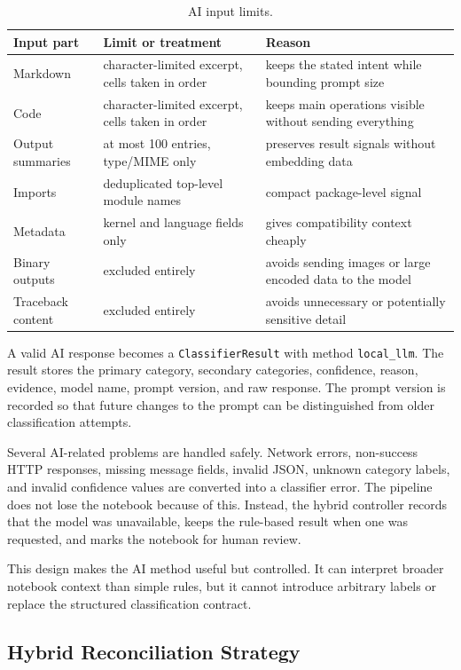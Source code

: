 \begin{table}[ht]
\centering
\caption{AI input limits.}
\label{tab:ai-input-limits}
\small
\begin{tabularx}{\textwidth}{@{}p{2.8cm}p{4.2cm}X@{}}
\toprule
Input part & Limit or treatment & Reason\tabularnewline
\midrule
Markdown & character-limited excerpt, cells taken in order & keeps the stated intent while bounding prompt size\tabularnewline
Code & character-limited excerpt, cells taken in order & keeps main operations visible without sending everything\tabularnewline
Output summaries & at most 100 entries, type/MIME only & preserves result signals without embedding data\tabularnewline
Imports & deduplicated top-level module names & compact package-level signal\tabularnewline
Metadata & kernel and language fields only & gives compatibility context cheaply\tabularnewline
Binary outputs & excluded entirely & avoids sending images or large encoded data to the model\tabularnewline
Traceback content & excluded entirely & avoids unnecessary or potentially sensitive detail\tabularnewline
\bottomrule
\end{tabularx}
\end{table}

A valid AI response becomes a \texttt{ClassifierResult} with method \texttt{local\_llm}. The result stores the primary category, secondary categories, confidence, reason, evidence, model name, prompt version, and raw response. The prompt version is recorded so that future changes to the prompt can be distinguished from older classification attempts.

Several AI-related problems are handled safely. Network errors, non-success HTTP responses, missing message fields, invalid JSON, unknown category labels, and invalid confidence values are converted into a classifier error. The pipeline does not lose the notebook because of this. Instead, the hybrid controller records that the model was unavailable, keeps the rule-based result when one was requested, and marks the notebook for human review.

This design makes the AI method useful but controlled. It can interpret broader notebook context than simple rules, but it cannot introduce arbitrary labels or replace the structured classification contract.

\subsection{Hybrid Reconciliation Strategy}

